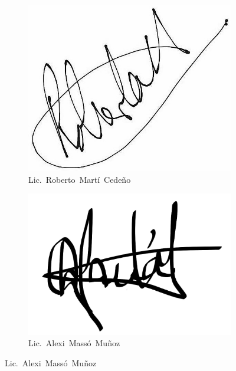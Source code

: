 \vspace{1cm}

\begin{figure}[!ht]
    \centering
    \begin{subfigure}{0.16\textwidth}
        \includegraphics[width=\textwidth]{Graphics/signatures/sign1-marti.jpg}
        \caption*{\mbox{Lic. Roberto Martí Cedeño}}
    \end{subfigure}
    \hspace{4cm}
    \begin{subfigure}{0.18\textwidth}
        \includegraphics[width=\textwidth]{Graphics/signatures/masso.jpg}
        \caption*{\mbox{Lic. Alexi Massó Muñoz}}
    \end{subfigure}
\end{figure}
